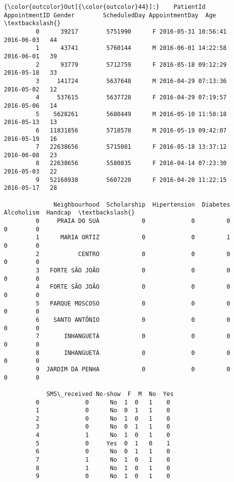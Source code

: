 \documentclass[11pt]{article}
\begin{document}
\begin{Verbatim}[commandchars=\\\{\}]
{\color{outcolor}Out[{\color{outcolor}44}]:}    PatientId  AppointmentID Gender        ScheduledDay AppointmentDay  Age  \textbackslash{}
         0      39217        5751990      F 2016-05-31 10:56:41     2016-06-03   44   
         1      43741        5760144      M 2016-06-01 14:22:58     2016-06-01   39   
         2      93779        5712759      F 2016-05-18 09:12:29     2016-05-18   33   
         3     141724        5637648      M 2016-04-29 07:13:36     2016-05-02   12   
         4     537615        5637728      F 2016-04-29 07:19:57     2016-05-06   14   
         5    5628261        5680449      M 2016-05-10 11:58:18     2016-05-13   13   
         6   11831856        5718578      M 2016-05-19 09:42:07     2016-05-19   16   
         7   22638656        5715081      F 2016-05-18 13:37:12     2016-06-08   23   
         8   22638656        5580835      F 2016-04-14 07:23:30     2016-05-03   22   
         9   52168938        5607220      F 2016-04-20 11:22:15     2016-05-17   28   
         
              Neighbourhood  Scholarship  Hipertension  Diabetes  Alcoholism  Handcap  \textbackslash{}
         0     PRAIA DO SUÁ            0             0         0           0        0   
         1      MARIA ORTIZ            0             0         1           0        0   
         2           CENTRO            0             0         0           0        0   
         3   FORTE SÃO JOÃO            0             0         0           0        0   
         4   FORTE SÃO JOÃO            0             0         0           0        0   
         5   PARQUE MOSCOSO            0             0         0           0        0   
         6    SANTO ANTÔNIO            0             0         0           0        0   
         7       INHANGUETÁ            0             0         0           0        0   
         8       INHANGUETÁ            0             0         0           0        0   
         9  JARDIM DA PENHA            0             0         0           0        0   
         
            SMS\_received No-show  F  M  No  Yes  
         0             0      No  1  0   1    0  
         1             0      No  0  1   1    0  
         2             0      No  1  0   1    0  
         3             0      No  0  1   1    0  
         4             1      No  1  0   1    0  
         5             0     Yes  0  1   0    1  
         6             0      No  0  1   1    0  
         7             1      No  1  0   1    0  
         8             1      No  1  0   1    0  
         9             0      No  1  0   1    0  
\end{Verbatim}
            
\end{document}
